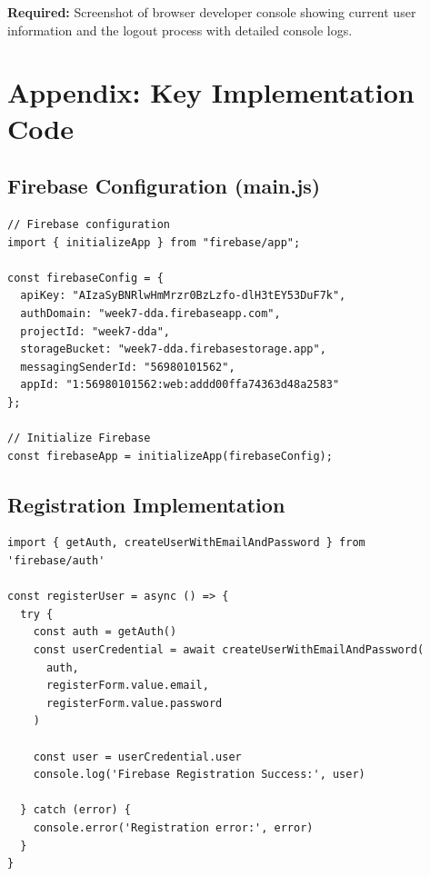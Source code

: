 \documentclass[11pt,a4paper]{article}
\begin{document}
\textbf{Required:} Screenshot of browser developer console showing current user information and the logout process with detailed console logs.

\newpage


\section{Appendix: Key Implementation Code}

\subsection{Firebase Configuration (main.js)}

\begin{lstlisting}[caption=Firebase initialization in main.js]
// Firebase configuration
import { initializeApp } from "firebase/app";

const firebaseConfig = {
  apiKey: "AIzaSyBNRlwHmMrzr0BzLzfo-dlH3tEY53DuF7k",
  authDomain: "week7-dda.firebaseapp.com",
  projectId: "week7-dda",
  storageBucket: "week7-dda.firebasestorage.app",
  messagingSenderId: "56980101562",
  appId: "1:56980101562:web:addd00ffa74363d48a2583"
};

// Initialize Firebase
const firebaseApp = initializeApp(firebaseConfig);
\end{lstlisting}

\subsection{Registration Implementation}

\begin{lstlisting}[caption=Key registration function from FirebaseRegisterView.vue]
import { getAuth, createUserWithEmailAndPassword } from 'firebase/auth'

const registerUser = async () => {
  try {
    const auth = getAuth()
    const userCredential = await createUserWithEmailAndPassword(
      auth, 
      registerForm.value.email, 
      registerForm.value.password
    )
    
    const user = userCredential.user
    console.log('Firebase Registration Success:', user)
    
  } catch (error) {
    console.error('Registration error:', error)
  }
}
\end{lstlisting}
\end{document}
